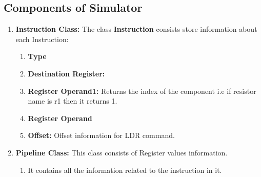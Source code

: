 \documentclass[12pt]{extarticle}
\begin{document}
\subsection{Components of Simulator}
\begin{enumerate}
\item \textbf{Instruction Class:}
The class \textbf{Instruction} consists store information about each Instruction:
\begin{enumerate}
\item \textbf{Type}
\item \textbf{Destination Register: }
\item \textbf{Register Operand1:} Returns the index of the component i.e if resistor name is r1 then it returns 1.
\item \textbf{Register Operand}
\item \textbf{Offset:} Offset information for LDR command.
\end{enumerate} 
\item \textbf{Pipeline Class:}
This class consists of Register values information.
\begin{enumerate}
\item It contains all the information related to the instruction in it.
\end{enumerate}

\end{enumerate}
\end{document}
